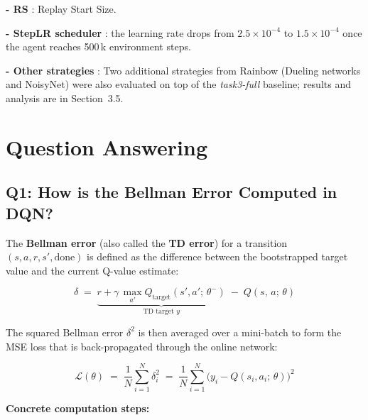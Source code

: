 \documentclass[12pt,a4paper]{report}
\begin{document}
\textbf{- RS} : Replay Start Size.

\textbf{- StepLR scheduler} : the learning rate drops from $2.5\times10^{-4}$ to
$1.5\times10^{-4}$ once the agent reaches 500\,k environment steps.

\textbf{- Other strategies} : Two additional strategies from Rainbow (Dueling networks and NoisyNet) were also evaluated
on top of the \textit{task3-full} baseline; results and analysis are in Section~3.5.


\newpage

\section{Question Answering}

\subsection*{Q1: How is the Bellman Error Computed in DQN?}

The \textbf{Bellman error} (also called the \textbf{TD error}) for a transition
$(s, a, r, s', \text{done})$ is defined as the difference between the bootstrapped target
value and the current Q-value estimate:

\begin{equation}
  \delta \;=\;
  \underbrace{r + \gamma\,\max_{a'} Q_{\text{target}}(s',a';\,\theta^-)}_{\text{TD target }y}
  \;-\;
  Q(s,\,a;\,\theta)
\end{equation}

The squared Bellman error $\delta^2$ is then averaged over a mini-batch to form the MSE loss
that is back-propagated through the online network:

\begin{equation}
  \mathcal{L}(\theta) \;=\;
  \frac{1}{N}\sum_{i=1}^{N} \delta_i^2
  \;=\;
  \frac{1}{N}\sum_{i=1}^{N}
  \bigl(y_i - Q(s_i,a_i;\,\theta)\bigr)^2
\end{equation}

\textbf{Concrete computation steps:}
\end{document}
